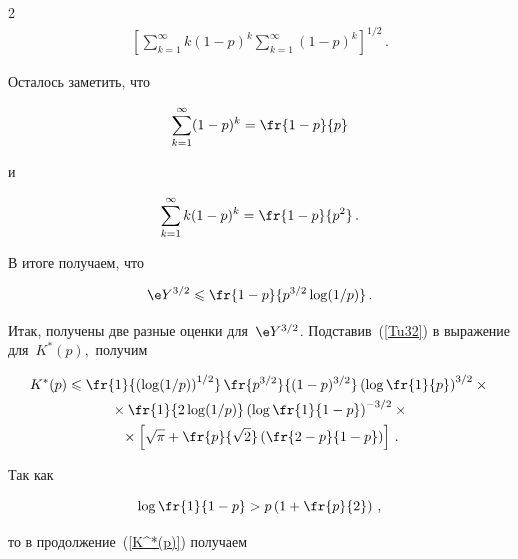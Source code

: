 \begin{multicols}{2}
\begin{multline*}
\left[\sum\limits_{k=1}^\infty k (1-p)^k \sum\limits_{k=1}^\infty


(1-p)^k\right]^{1/2}\,.


\end{multline*}


Осталось заметить, что


$$


\sum\limits_{k=1}^\infty (1-p)^k = \fr{1-p}{p}


$$


и


$$


\sum\limits_{k=1}^\infty k (1-p)^k = \fr{1-p}{p^2}\,.


$$


В итоге получаем, что


\begin{equation}


 \e Y^{3/2}\leqslant \fr{1-p}{p^{3/2}\log(1/p)}\,.


 \label{Tu33}


\end{equation}


Итак, получены две разные оценки для~$\e Y^{3/2}$. Подставив~(\ref{Tu32}) в выражение для~$K^*(p),$ получим


\begin{multline}


K^*(p) \leqslant  \fr{1}{\left(\log(1/p)\right)^{1/2}} \,


\fr{p^{3/2}}{(1-p)^{3/2}}\left(\log\fr{1}{p}\right)^{3/2} \times{}


\\


{}


\times\fr{1}{2\log({1}/{p})}


\left(\log\fr{1}{1-p}\right)^{-3/2}\times{}\\


{}\times \left[\sqrt{\pi}+\fr{p}{\sqrt{2}}\left(\fr{2-p}{1-p}\right)\right]\,.


\label{K^*(p)}


\end{multline}


Так как


$$


\log{\fr{1}{1-p}} > p\left(1+\fr{p}{2}\right)\,,


$$


то в продолжение~(\ref{K^*(p)}) получаем


\begin{multline}



\end{multline}
\end{multicols}
